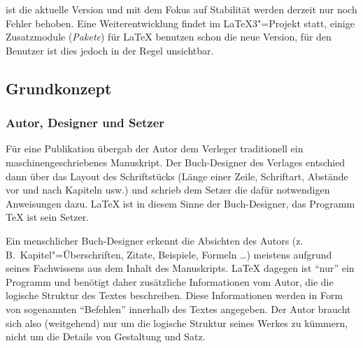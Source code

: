 


\LaTeXe{} ist die aktuelle Version und mit dem Fokus auf Stabilität werden derzeit nur noch Fehler behoben. Eine Weiterentwicklung findet im \LaTeX{}3"=Projekt statt, einige Zusatzmodule (\emph{Pakete}) für \LaTeX{} benutzen schon die neue Version, für den Benutzer ist dies jedoch in der Regel unsichtbar.


\subsection{Grundkonzept}
 
\subsubsection{Autor, Designer und Setzer}
 
Für eine Publikation übergab der Autor dem Verleger
traditionell  ein maschinengeschriebenes Manuskript.  Der
Buch-Designer des Verlages entschied dann über das Layout des
Schriftstücks (Länge einer Zeile, Schriftart, Abstände vor
und nach Kapiteln usw.\@) und schrieb dem Setzer die
dafür notwendigen Anweisungen dazu.
\LaTeX{} ist in diesem Sinne der Buch-Designer, 
das Programm \TeX{} ist sein Setzer.
 
Ein menschlicher Buch-Designer erkennt die Absichten des Autors
(z.\,B.\ Kapitel"=Überschriften, Zitate, Beispiele, Formeln
\dots) meistens aufgrund seines Fachwissens aus dem Inhalt des
Manuskripts.  \LaTeX{} dagegen ist "`nur"' ein Programm und
benötigt daher zusätzliche Informationen vom Autor, die die
logische Struktur des Textes beschreiben.
Diese Informationen werden in Form von sogenannten "`Befehlen"'
innerhalb des Textes angegeben.
Der Autor braucht sich also
(weitgehend) nur um die logische Struktur seines Werkes zu kümmern,
nicht um die Details von Gestaltung und Satz.
 
